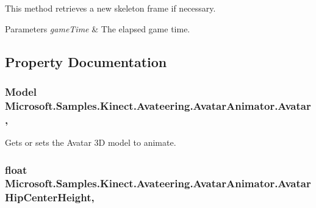 This method retrieves a new skeleton frame if necessary. 


\begin{DoxyParams}{Parameters}
{\em game\+Time} & The elapsed game time.\\
\hline
\end{DoxyParams}


\subsection{Property Documentation}
\hypertarget{class_microsoft_1_1_samples_1_1_kinect_1_1_avateering_1_1_avatar_animator_a6387822c328c988fe91ce1dacff089b8}{
\subsubsection[{Avatar}]{\setlength{\rightskip}{0pt plus 5cm}Model Microsoft.\+Samples.\+Kinect.\+Avateering.\+Avatar\+Animator.\+Avatar\hspace{0.3cm}{\ttfamily [get]}, {\ttfamily [set]}}}\label{class_microsoft_1_1_samples_1_1_kinect_1_1_avateering_1_1_avatar_animator_a6387822c328c988fe91ce1dacff089b8}


Gets or sets the Avatar 3\+D model to animate. 

\hypertarget{class_microsoft_1_1_samples_1_1_kinect_1_1_avateering_1_1_avatar_animator_a0af976059d0d5692d70c7fa6e35c1bd7}{
\subsubsection[{Avatar\+Hip\+Center\+Height}]{\setlength{\rightskip}{0pt plus 5cm}float Microsoft.\+Samples.\+Kinect.\+Avateering.\+Avatar\+Animator.\+Avatar\+Hip\+Center\+Height\hspace{0.3cm}{\ttfamily [get]}, {\ttfamily [set]}}}\label{class_microsoft_1_1_samples_1_1_kinect_1_1_avateering_1_1_avatar_animator_a0af976059d0d5692d70c7fa6e35c1bd7}


